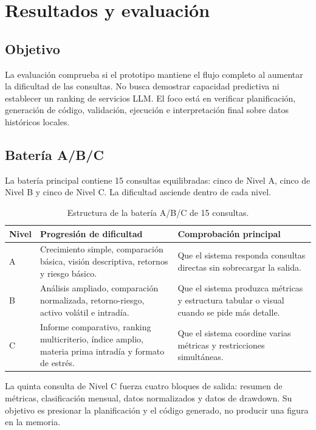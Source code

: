 \chapter{Resultados y evaluación}

\section{Objetivo}

La evaluación comprueba si el prototipo mantiene el flujo completo al aumentar la dificultad de las consultas. No busca demostrar capacidad predictiva ni establecer un ranking de servicios LLM. El foco está en verificar planificación, generación de código, validación, ejecución e interpretación final sobre datos históricos locales.

\section{Batería A/B/C}

La batería principal contiene 15 consultas equilibradas: cinco de Nivel A, cinco de Nivel B y cinco de Nivel C. La dificultad asciende dentro de cada nivel.

\begin{table}[H]
\centering
\small
\begin{tabularx}{\textwidth}{l X X}
\toprule
\textbf{Nivel} & \textbf{Progresión de dificultad} & \textbf{Comprobación principal} \\
\midrule
A & Crecimiento simple, comparación básica, visión descriptiva, retornos y riesgo básico. & Que el sistema responda consultas directas sin sobrecargar la salida. \\
B & Análisis ampliado, comparación normalizada, retorno-riesgo, activo volátil e intradía. & Que el sistema produzca métricas y estructura tabular o visual cuando se pide más detalle. \\
C & Informe comparativo, ranking multicriterio, índice amplio, materia prima intradía y formato de estrés. & Que el sistema coordine varias métricas y restricciones simultáneas. \\
\bottomrule
\end{tabularx}
\caption{Estructura de la batería A/B/C de 15 consultas.}
\label{tab:bateria_abc}
\end{table}

La quinta consulta de Nivel C fuerza cuatro bloques de salida: resumen de métricas, clasificación mensual, datos normalizados y datos de drawdown. Su objetivo es presionar la planificación y el código generado, no producir una figura en la memoria.

